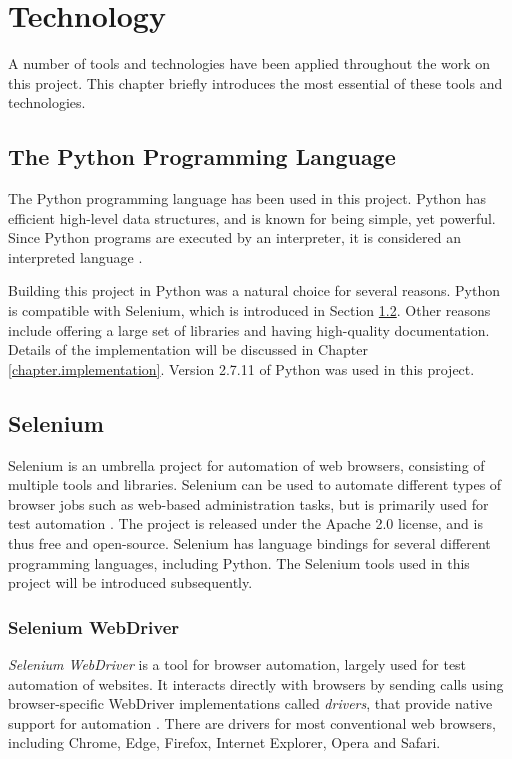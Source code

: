 \section{Technology}\label{chapter.technology}
\thispagestyle{plain}
A number of tools and technologies have been applied throughout the work on this project. This chapter briefly introduces the most essential of these tools and technologies.%

\subsection{The Python Programming Language}
The Python programming language has been used in this project. Python has efficient high-level data structures, and is known for being simple, yet powerful. Since Python programs are executed by an interpreter, it is considered an interpreted language \cite{abyteofpython}.

Building this project in Python was a natural choice for several reasons. Python is compatible with Selenium, which is introduced in Section \ref{subsec.selenium}. Other reasons include offering a large set of libraries and having high-quality documentation. Details of the implementation will be discussed in Chapter \ref{chapter.implementation}. Version 2.7.11 of Python was used in this project.


\subsection{Selenium}\label{subsec.selenium}
Selenium is an umbrella project for automation of web browsers, consisting of multiple tools and libraries. Selenium can be used to automate different types of browser jobs such as web-based administration tasks, but is primarily used for test automation \cite{http://www.seleniumhq.org/}. The project is released under the Apache 2.0 license, and is thus free and open-source. Selenium has language bindings for several different programming languages, including Python. The Selenium tools used in this project will be introduced subsequently.

\subsubsection{Selenium WebDriver}\label{sec.webdriver}
\emph{Selenium WebDriver} is a tool for browser automation, largely used for test automation of websites. It interacts directly with browsers by sending calls using browser-specific WebDriver implementations called \emph{drivers}, that provide native support for automation \cite{selDocWebDriver}. There are drivers for most conventional web browsers, including Chrome, Edge, Firefox, Internet Explorer, Opera and Safari.

